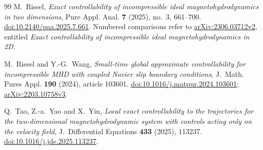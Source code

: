 \documentclass[11pt,a4paper]{amsart}
\theoremstyle{definition}
\theoremstyle{remark}
\numberwithin{equation}{section}
\begin{document}
\begin{thebibliography}{99}
M.~Rissel,
\emph{Exact controllability of incompressible ideal magnetohydrodynamics
in two dimensions},
Pure Appl. Anal. \textbf{7} (2025), no.~3, 661--700.
\href{https://doi.org/10.2140/paa.2025.7.661}{doi:10.2140/paa.2025.7.661}.
Numbered comparisons refer to
\href{https://arxiv.org/html/2306.03712v2}{arXiv:2306.03712v2},
entitled \emph{Exact controllability of incompressible ideal magnetohydrodynamics in 2D}.

M.~Rissel and Y.-G.~Wang,
\emph{Small-time global approximate controllability for
incompressible MHD with coupled Navier slip boundary conditions},
J.~Math. Pures Appl. \textbf{190} (2024), article 103601.
\href{https://doi.org/10.1016/j.matpur.2024.103601}{doi:10.1016/j.matpur.2024.103601};
\href{https://arxiv.org/pdf/2203.10758v3}{arXiv:2203.10758v3}.

Q.~Tao, Z.-a.~Yao and X.~Yin,
\emph{Local exact controllability to the trajectories for the two-dimensional
magnetohydrodynamic system with controls acting only on the velocity field},
J.~Differential Equations \textbf{433} (2025), 113237.
\href{https://doi.org/10.1016/j.jde.2025.113237}{doi:10.1016/j.jde.2025.113237}.

\end{thebibliography}
\end{document}
